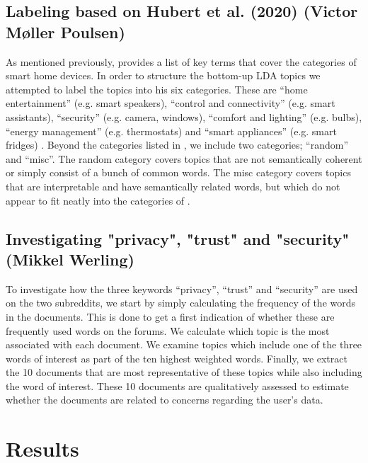 \documentclass{article}
\begin{document}
    \subsection{Labeling based on Hubert et al. (2020) (Victor Møller Poulsen)}
    As mentioned previously,  provides a list of key terms that cover the categories of smart home devices. In order to structure the bottom-up LDA topics we attempted to label the topics into his six categories. These are “home entertainment” (e.g. smart speakers), “control and connectivity” (e.g. smart assistants), “security” (e.g. camera, windows), “comfort and lighting” (e.g. bulbs), “energy management” (e.g. thermostats) and “smart appliances” (e.g. smart fridges) \cite[p. 1]{hubert2020take}. Beyond the categories listed in , we include two categories; “random” and “misc”. The random category covers topics that are not semantically coherent or simply consist of a bunch of common words. The misc category covers topics that are interpretable and have semantically related words, but which do not appear to fit neatly into the categories of .  
    
    \subsection{Investigating "privacy", "trust" and "security" (Mikkel Werling)}
    To investigate how the three keywords “privacy”, “trust” and “security” are used on the two subreddits, we start by simply calculating the frequency of the words in the documents. This is done to get a first indication of whether these are frequently used words on the forums. We calculate which topic is the most associated with each document. We examine topics which include one of the three words of interest as part of the ten highest weighted words. Finally, we extract the 10 documents that are most representative of these topics while also including the word of interest. These 10 documents are qualitatively assessed to estimate whether the documents are related to concerns regarding the user's data. 
    \section{Results}
\end{document}
